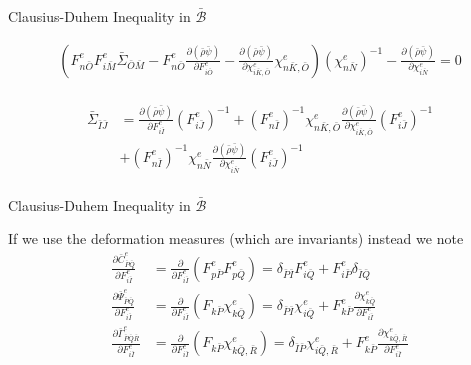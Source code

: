 \documentclass[11pt]{beamer}
\begin{document}
\begin{frame}{Clausius-Duhem Inequality in $\bar{\mathcal{B}}$}

\begin{align*}
\left(F_{n\bar{O}}^e  F_{i\bar{M}}^e \bar{\Sigma}_{\bar{O}\bar{M}} - F_{n\bar{O}}^e \frac{\partial\left(\bar{\rho}\bar{\psi}\right)}{\partial F_{i\bar{O}}^e} - \frac{\partial \left(\bar{\rho}\bar{\psi}\right)}{\partial \chi_{i\bar{K},\bar{O}}^e} \chi_{n\bar{K},\bar{O}}^e\right)\left(\chi_{n\bar{N}}^e\right)^{-1}- \frac{\partial\left(\bar{\rho}\bar{\psi}\right)}{\partial \chi_{i\bar{N}}^e} = 0\\
\end{align*}

\begin{align*}
\bar{\Sigma}_{\bar{I}\bar{J}} &= \frac{\partial\left(\bar{\rho}\bar{\psi}\right)}{\partial F_{i\bar{I}}^e}\left(F_{i\bar{J}}^e\right)^{-1}  + \left(F_{n\bar{I}}^e\right)^{-1} \chi_{n\bar{K},\bar{O}}^e \frac{\partial \left(\bar{\rho}\bar{\psi}\right)}{\partial \chi_{i\bar{K},\bar{O}}^e} \left(F_{i\bar{J}}^e\right)^{-1}\\
&+ \left(F_{n\bar{I}}^e\right)^{-1} \chi_{n\bar{N}}^e \frac{\partial\left(\bar{\rho}\bar{\psi}\right)}{\partial \chi_{i\bar{N}}^e} \left(F_{i\bar{J}}^e\right)^{-1}\\
\end{align*}

\end{frame}

\begin{frame}{Clausius-Duhem Inequality in $\bar{\mathcal{B}}$}

If we use the deformation measures (which are invariants) instead we note
\begin{align*}
\frac{\partial \bar{C}_{\bar{P}\bar{Q}}^e}{\partial F_{i\bar{I}}^e} &= \frac{\partial}{\partial F_{i\bar{I}}^e}\left(F_{p\bar{P}}^e F_{p\bar{Q}}^e\right) = \delta_{\bar{P}\bar{I}} F_{i\bar{Q}}^e + F_{i\bar{P}}^e \delta_{\bar{I}\bar{Q}}\\
\frac{\partial \bar{\Psi}_{\bar{P}\bar{Q}}^e}{\partial F_{i\bar{I}}^e} &= \frac{\partial}{\partial F_{i\bar{I}}^e} \left( F_{k\bar{P}} \chi_{k\bar{Q}}^e\right)= \delta_{\bar{P}\bar{I}} \chi_{i\bar{Q}}^e + F_{k\bar{P}}^e \frac{\partial \chi_{k\bar{Q}}^e}{\partial F_{i\bar{I}}^e}\\
\frac{\partial \bar{\Gamma}_{\bar{P}\bar{Q}\bar{R}}^e}{\partial F_{i\bar{I}}^e} &= \frac{\partial}{\partial F_{i\bar{I}}^e}\left(F_{k\bar{P}} \chi_{k\bar{Q},\bar{R}}^e\right) = \delta_{\bar{I}\bar{P}} \chi_{i\bar{Q},\bar{R}}^e + F_{k\bar{P}}^e \frac{\partial \chi_{k\bar{Q},\bar{R}}^e}{\partial F_{i\bar{I}}^e}\\
\end{align*}

\end{frame}
\end{document}
